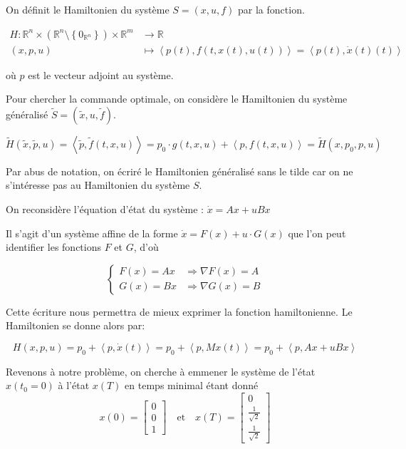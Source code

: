 \documentclass[
  french,
]{article}
\begin{document}
On définit le Hamiltonien du système \(S=(x, u, f)\) par la fonction.

\begin{align}
H: \mathbb{R}^n\times\left(\mathbb{R}^n\setminus\left\{0_{\mathbb{R}^n}\right\}\right)\times\mathbb{R}^m &\rightarrow \mathbb{R}\\
    (x, p, u) &\mapsto \left\langle p(t){,}f(t,x(t),u(t))\right\rangle
        = \left\langle p(t){,}\dot{x}(t)(t)\right\rangle
\end{align}

où \(p\) est le vecteur adjoint au système.

Pour chercher la commande optimale, on considère le Hamiltonien du système généralisé
\(\tilde{S}=(\tilde{x},u, \tilde{f})\).

\[ \tilde{H}(\tilde{x}, \tilde{p}, u) = \left\langle\tilde{p}{,}\tilde{f}(t,x,u)\right\rangle
    = p_0\cdot g(t,x,u) + \left\langle p{,}f(t, x, u)\right\rangle
    = \tilde{H}(x, p_0, p, u)\]

Par abus de notation, on écriré le Hamiltonien généralisé sans le tilde
car on ne s'intéresse pas au Hamiltonien du système \(S\).

On reconsidère l'équation d'état du système : \(\dot x = Ax + uBx\)

Il s'agit d'un système affine de la forme
\(\dot x = F(x) + u\cdot G(x)\)
que l'on peut identifier les fonctions \(F\) et \(G\), d'où

\[\begin{cases}
    F(x) = Ax &\Rightarrow \nabla F(x) = A\\
    G(x) = Bx &\Rightarrow \nabla G(x) = B
\end{cases}\]

Cette écriture nous permettra de mieux exprimer la fonction
hamiltonienne. Le Hamiltonien se donne alors par:

\[H(x, p, u) = p_0 + \left\langle p{,}\dot{x}(t)\right\rangle
    = p_0 + \left\langle p{,}Mx(t)\right\rangle
    = p_0 + \left\langle p{,}Ax + uBx\right\rangle\]

Revenons à notre problème, on cherche à emmener le système
de l'état \(x(t_0=0)\) à l'état \(x(T)\) en temps minimal étant donné
\[ x(0) = \left[\begin{matrix}0\\0\\1\end{matrix}\right] \quad\text{et}\quad
    x(T) = \begin{bmatrix}0\\\frac{1}{\sqrt 2}\\\frac{1}{\sqrt 2}\end{bmatrix}\]
\end{document}
